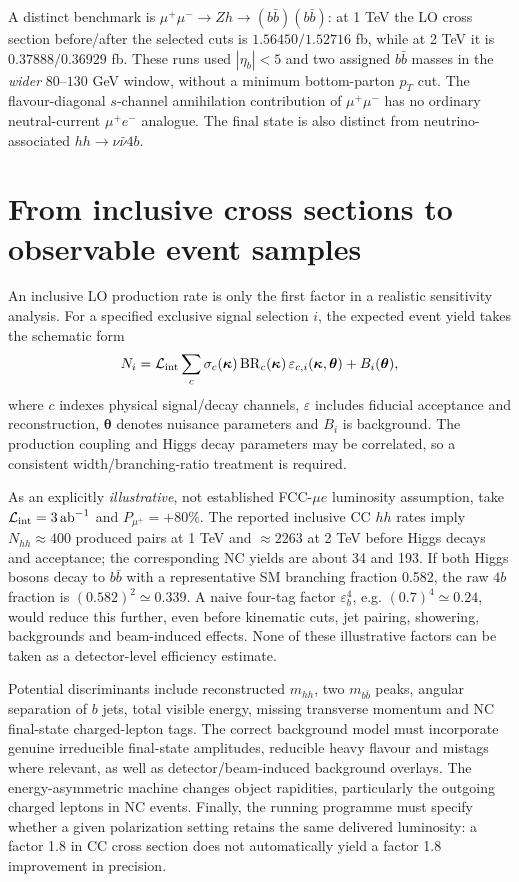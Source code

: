 \documentclass[12pt,a4paper]{article}
\newcommand{\newnote}{\clearpage}
\newcommand{\eps}{\varepsilon}
\newcommand{\Lumi}{\mathcal{L}}
\begin{document}
A distinct benchmark is $\mu^+\mu^-\to Zh\to (b\bar b)(b\bar b)$: at 1 TeV the LO cross section before/after the selected cuts is $1.56450/1.52716$ fb, while at 2 TeV it is $0.37888/0.36929$ fb. These runs used $|\eta_b|<5$ and two assigned $b\bar b$ masses in the \emph{wider} $80$--$130$ GeV window, without a minimum bottom-parton $p_T$ cut. The flavour-diagonal $s$-channel annihilation contribution of $\mu^+\mu^-$ has no ordinary neutral-current $\mu^+e^-$ analogue. The final state is also distinct from neutrino-associated $hh\to\nu\bar\nu4b$.




\newnote

\section{From inclusive cross sections to observable event samples}


An inclusive LO production rate is only the first factor in a realistic sensitivity analysis. For a specified exclusive signal selection $i$, the expected event yield takes the schematic form
\begin{equation}\label{eq:yields}
N_i=\Lumi_{\rm int}\sum_{c}\sigma_c(\bm\kappa)\,
\mathrm{BR}_c(\bm\kappa)\,\eps_{c,i}(\bm\kappa,\bm\theta)+B_i(\bm\theta),
\end{equation}
where $c$ indexes physical signal/decay channels, $\eps$ includes fiducial acceptance and reconstruction, $\bm\theta$ denotes nuisance parameters and $B_i$ is background. The production coupling and Higgs decay parameters may be correlated, so a consistent width/branching-ratio treatment is required.

As an explicitly \emph{illustrative}, not established FCC-$\mu e$ luminosity assumption, take $\Lumi_{\rm int}=3\,\mathrm{ab}^{-1}$ and $P_{\mu^+}=+80\%$. The reported inclusive CC $hh$ rates imply $N_{hh}\approx400$ produced pairs at 1 TeV and $\approx2263$ at 2 TeV before Higgs decays and acceptance; the corresponding NC yields are about 34 and 193. If both Higgs bosons decay to $b\bar b$ with a representative SM branching fraction 0.582, the raw $4b$ fraction is $(0.582)^2\simeq0.339$. A naive four-tag factor $\eps_b^4$, e.g. $(0.7)^4\simeq0.24$, would reduce this further, even before kinematic cuts, jet pairing, showering, backgrounds and beam-induced effects. None of these illustrative factors can be taken as a detector-level efficiency estimate.

Potential discriminants include reconstructed $m_{hh}$, two $m_{b\bar b}$ peaks, angular separation of $b$ jets, total visible energy, missing transverse momentum and NC final-state charged-lepton tags. The correct background model must incorporate genuine irreducible final-state amplitudes, reducible heavy flavour and mistags where relevant, as well as detector/beam-induced background overlays. The energy-asymmetric machine changes object rapidities, particularly the outgoing charged leptons in NC events. Finally, the running programme must specify whether a given polarization setting retains the same delivered luminosity: a factor 1.8 in CC cross section does not automatically yield a factor 1.8 improvement in precision.
\end{document}
